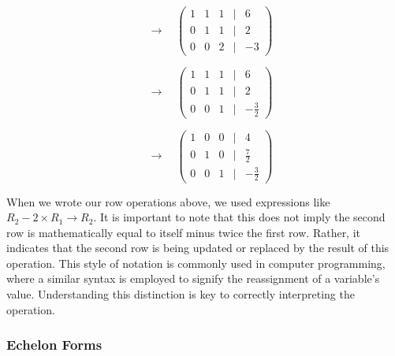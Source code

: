 \documentclass[a4paper,12pt]{article}
\begin{document}
\begin{frame}
\[
\quad
\longrightarrow
\quad
\begin{pmatrix}
1 & 1 & 1 & \big| & 6 \\
0 & 1 & 1 & \big| & 2 \\
0 & 0 & 2 & \big| & -3
\end{pmatrix}
\]


\[
\quad
\longrightarrow
\quad
\begin{pmatrix}
1 & 1 & 1 & \big| & 6 \\
0 & 1 & 1 & \big| & 2 \\
0 & 0 & 1 & \big| & -\frac{3}{2}
\end{pmatrix}
\]


\[
\quad
\longrightarrow
\quad
\begin{pmatrix}
1 & 0 & 0 & \big| & 4 \\
0 & 1 & 0 & \big| & \frac{7}{2} \\
0 & 0 & 1 & \big| & -\frac{3}{2}
\end{pmatrix}
\]
\begin{tcolorbox}[title=Attention!,colframe=blue!70!black, colback=blue!5!white]
    When we wrote our row operations above, we used expressions like \(R_2 - 2 \times R_1 \xrightarrow{} R_2\). It is important to note that this does not imply the second row is mathematically equal to itself minus twice the first row. Rather, it indicates that the second row is being updated or replaced by the result of this operation. This style of notation is commonly used in computer programming, where a similar syntax is employed to signify the reassignment of a variable's value. Understanding this distinction is key to correctly interpreting the operation.
\end{tcolorbox}
\end{frame}
\Large \subsubsection{Echelon Forms}\label{sec:echelon-forms}
\end{document}

